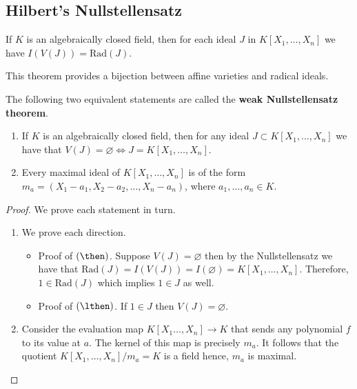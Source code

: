 \documentclass[12pt, a4paper]{article}
\begin{document}
\subsection{Hilbert's Nullstellensatz}

\begin{mdthm}
    If \(K\) is an algebraically closed field, then for each ideal \(J\) in \(K[X_1,\ldots,X_n]\) we have \(I(V(J)) = \text{Rad}(J)\).
\end{mdthm}

\begin{mdnote}
    This theorem provides a bijection between affine varieties and radical ideals.
\end{mdnote}

\begin{mdcor}
    The following two equivalent statements are called the \textbf{weak Nullstellensatz theorem}.
    \begin{enumerate}
        \item If \(K\) is an algebraically closed field, then for any ideal \(J \subset K[X_1,\ldots,X_n]\) we have that \(V(J)=\varnothing \iff J = K[X_1,\ldots,X_n]\).
        \item Every maximal ideal of \(K[X_1,\ldots,X_n]\) is of the form \(m_a=(X_1-a_1,X_2-a_2,\ldots,X_n-a_n)\), where \(a_1,\ldots,a_n \in K\). 
    \end{enumerate}
\end{mdcor}

\begin{proof}
    We prove each statement in turn.
    \begin{enumerate}
        \item We prove each direction.
            \begin{itemize}
                \item Proof of \((\then)\). Suppose \(V(J)= \varnothing\) then by the Nullstellensatz we have that \(\text{Rad}(J)=I(V(J))=I(\varnothing) =K[X_1,\ldots,X_n]\). Therefore, \(1 \in \text{Rad}(J)\) which implies \(1\in J\) as well.
                \item Proof of \((\lthen)\). If \(1 \in J\) then \(V(J)=\varnothing\).
            \end{itemize}
        \item Consider the evaluation map \(K[X_1\ldots,X_n] \to K\) that sends any polynomial \(f\) to its value at \(a\). The kernel of this map is precisely \(m_a\). It follows that the quotient \(K[X_1,\ldots,X_n]/m_a = K\) is a field hence, \(m_a\) is maximal.
    \end{enumerate}
\end{proof}
\end{document}
